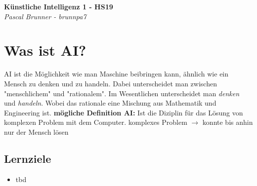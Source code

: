 \documentclass{article}
\theoremstyle{merke}
\theoremstyle{definition}
\begin{document}
\begin{titlepage}
   \begin{center}
      \Large\textbf{Künstliche Intelligenz 1 - HS19}\\
      \large\textit{Pascal Brunner - brunnpa7}
   \end{center}
\end{titlepage}


\tableofcontents
\newpage



\section{Was ist AI?}
AI ist die Möglichkeit wie man Maschine beibringen kann, ähnlich wie ein Mensch zu denken und zu handeln. Dabei unterscheidet man zwischen "menschlichem" und "rationalem". Im Wesentlichen unterscheidet man \textit{denken} und \textit{handeln}. Wobei das rationale eine Mischung aus Mathematik und Engineering ist.
\textbf{mögliche Definition AI:} Ist die Diziplin für das Lösung von komplexen Problem mit dem Computer. komplexes Problem $\rightarrow$ konnte bis anhin nur der Mensch lösen

\subsection{Lernziele}
\begin{itemize}
\item tbd
\end{itemize}
\end{document}
